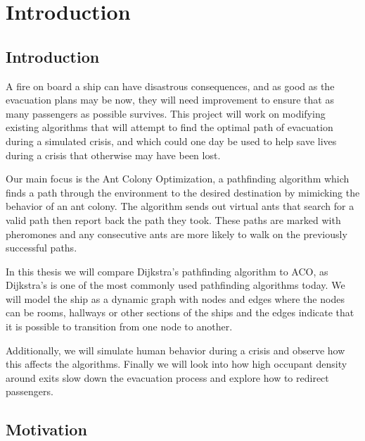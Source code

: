 \chapter{Introduction}
\label{ch:introduction}

\section{Introduction}

A fire on board a ship can have disastrous consequences, and as good as the evacuation plans may be now,                           
they will need improvement to ensure that as many passengers as possible survives. This project will work                           
 on modifying existing algorithms that will attempt to find the optimal path of evacuation during a simulated crisis, and which could         
 one day be used to help save lives during a crisis that otherwise may have been lost. 

Our main focus is the Ant Colony Optimization, a pathfinding algorithm which finds a path through
 the environment to the desired destination by mimicking the behavior of an ant colony. The algorithm sends    
out virtual ants that search for a valid path then report back the path they took.            
These paths are marked with pheromones and any consecutive ants are more likely to walk on the previously successful paths.

In this thesis we will compare Dijkstra's pathfinding algorithm to ACO, as Dijkstra's is one of the most commonly
 used pathfinding algorithms today. We will model the ship as a dynamic graph with nodes and edges where
 the nodes can be rooms, hallways or other sections of the ships and the edges indicate that it is possible to
 transition from one node to another. 

Additionally, we will simulate human behavior during a crisis and observe
 how this affects the algorithms. Finally we will look into how high occupant density around exits slow down the 
evacuation process and explore how to redirect passengers.

\section{Motivation}


